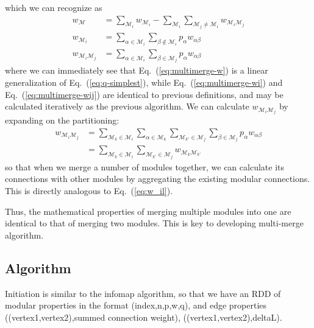 \documentclass[12pt,a4paper]{article}
\begin{document}
which we can recognize as
\begin{align}
    w_\mathcal{M} &= \sum_{\mathcal{M}_i} w_{\mathcal{M}_i} -\sum_{\mathcal{M}_i} \sum_{\mathcal{M}_j\neq\mathcal{M}_i} w_{\mathcal{M}_i\mathcal{M}_j} \label{eq:multimerge-w} \\
    w_{\mathcal{M}_i} &= \sum_{\alpha\in\mathcal{M}_i} \sum_{\beta\notin\mathcal{M}_i} p_\alpha w_{\alpha\beta} \label{eq:multimerge-wi} \\
    w_{\mathcal{M}_i\mathcal{M}_j} &= \sum_{\alpha\in\mathcal{M}_i}\sum_{\beta\in\mathcal{M}_j} p_\alpha w_{\alpha\beta} \label{eq:multimerge-wij}
\end{align}
where we can immediately see that Eq.~(\ref{eq:multimerge-w}) is a linear generalization of Eq.~(\ref{eq:q-simplest}), while Eq.~(\ref{eq:multimerge-wi}) and Eq.~(\ref{eq:multimerge-wij}) are identical to previous definitions, and may be calculated iteratively as the previous algorithm. We can calculate \(w_{\mathcal{M}_i\mathcal{M}_j}\) by expanding on the partitioning:
\begin{align}
    w_{\mathcal{M}_i\mathcal{M}_j} &= \sum_{\mathcal{M}_k\in\mathcal{M}_i} \sum_{\alpha\in\mathcal{M}_k} \sum_{\mathcal{M}_{k'}\in\mathcal{M}_j} \sum_{\beta\in\mathcal{M}_j} p_\alpha w_{\alpha\beta}\\
    &= \sum_{\mathcal{M}_k\in\mathcal{M}_i} \sum_{\mathcal{M}_{k'}\in\mathcal{M}_j} w_{\mathcal{M}_k\mathcal{M}_{k'}}
\end{align}
so that when we merge a number of modules together, we can calculate its connections with other modules by aggregating the existing modular connections. This is directly analogous to Eq.~(\ref{eq:w_il}).

Thus, the mathematical properties of merging multiple modules into one are identical to that of merging two modules. This is key to developing multi-merge algorithm.

\subsection{Algorithm}

Initiation is similar to the infomap algorithm, so that we have an RDD of modular properties in the format (index,n,p,w,q), and edge properties ((vertex1,vertex2),summed connection weight), ((vertex1,vertex2),deltaL).
\end{document}
